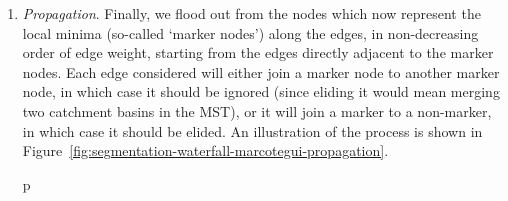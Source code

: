 \begin{enumerate}
\item \emph{Propagation}. Finally, we flood out from the nodes which now represent the local minima (so-called `marker nodes') along the edges, in non-decreasing order of edge weight, starting from the edges directly adjacent to the marker nodes. Each edge considered will either join a marker node to another marker node, in which case it should be ignored (since eliding it would mean merging two catchment basins in the MST), or it will join a marker to a non-marker, in which case it should be elided. An illustration of the process is shown in Figure~\ref{fig:segmentation-waterfall-marcotegui-propagation}.

\begin{stusubfig}{p}
	\hspace{4mm}%
	\hspace{4mm}%
\end{stusubfig}
\end{enumerate}
